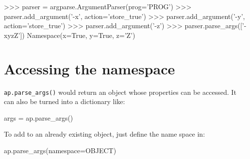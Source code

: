 \documentclass{article}
\begin{document}
\begin{python}
>>> parser = argparse.ArgumentParser(prog='PROG')
>>> parser.add_argument('-x', action='store_true')
>>> parser.add_argument('-y', action='store_true')
>>> parser.add_argument('-z')
>>> parser.parse_args(['-xyzZ'])
Namespace(x=True, y=True, z='Z')
\end{python}
\section{Accessing the namespace}
\texttt{ap.parse_args()} would return an object whose properties can be accessed. It can also be turned into a dictionary like:
\begin{python}
args = ap.parse_args()
\end{python}
To add to an already existing object, just define the name space in:
\begin{python}
ap.parse_args(namespace=OBJECT)
\end{python}
\end{document}
